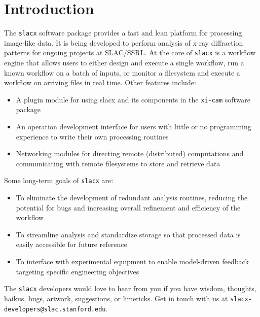 \section{Introduction}
\label{sec:introduction}

The \verb|slacx| software package provides 
a fast and lean platform for processing image-like data.
It is being developed to perform analysis of x-ray diffraction patterns 
for ongoing projects at SLAC/SSRL.
At the core of \verb|slacx| is a workflow engine
that allows users to either design and execute a single workflow,
run a known workflow on a batch of inputs,
or monitor a filesystem and execute a workflow on arriving files in real time.
Other features include:
\begin{itemize}
\item A plugin module for using slacx and its components 
    in the \verb|xi-cam| software package
\item An operation development interface 
    for users with little or no programming experience 
    to write their own processing routines 
\item Networking modules for directing remote (distributed) computations 
    and communicating with remote filesystems to store and retrieve data
\end{itemize}
Some long-term goals of \verb|slacx| are: 
\begin{itemize}
\item To eliminate the development of redundant analysis routines,
    reducing the potential for bugs 
    and increasing overall refinement and efficiency of the workflow
\item To streamline analysis and standardize storage 
    so that processed data is easily accessible for future reference
\item To interface with experimental equipment
    to enable model-driven feedback 
    targeting specific engineering objectives
\end{itemize}

The \verb|slacx| developers would love to hear from you
if you have wisdom, thoughts, haikus, bugs, artwork, suggestions, or limericks.
Get in touch with us at \verb|slacx-developers@slac.stanford.edu|.




